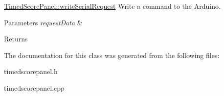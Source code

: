 \mbox{\hyperlink{classTimedScorePanel_a4e817b212121e6970b2af49c8e7c47ca}{Timed\+Score\+Panel\+::write\+Serial\+Request}} Write a command to the Arduino. 


\begin{DoxyParams}{Parameters}
{\em request\+Data} & \\
\hline
\end{DoxyParams}
\begin{DoxyReturn}{Returns}

\end{DoxyReturn}


The documentation for this class was generated from the following files\+:\begin{DoxyCompactItemize}
\item 
timedscorepanel.\+h\item 
timedscorepanel.\+cpp\end{DoxyCompactItemize}
